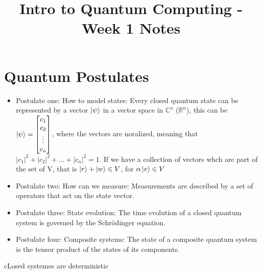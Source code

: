 \documentclass[11pt]{article}
\title{Intro to Quantum Computing - Week 1 Notes}
\author{}
\date{}
\begin{document}
\maketitle

\section{Quantum Postulates}

\begin{itemize}
    \item Postulate one: How to model states: Every closed quantum state can be represented by a vector $\ket{\psi}$ in a vector space in $ \mathbb{C}^n $ ($\mathbb{R}^n$), this can be $\ket{\psi}=\begin{bmatrix} c_1 \\ c_2 \\ \vdots \\ c_n \end{bmatrix}$, where the vectors are noralized, meaning that $|c_1|^2 + |c_2|^2 + ... + |c_n|^2 = 1$. If we have a collection of vectors whch are part of the set of V, that is $\ket{r} + \ket{w} \in V$, for $\alpha\ket{v} \in V$
    \item Postulate two: How can we measure: Measurements are described by a set of operators that act on the state vector.
    \item Postulate three: State evolution: The time evolution of a closed quantum system is governed by the Schrödinger equation.
    \item Postulate four: Composite systems: The state of a composite quantum system is the tensor product of the states of its components.
\end{itemize}


cLosed systemes are deterministic
\end{document}

